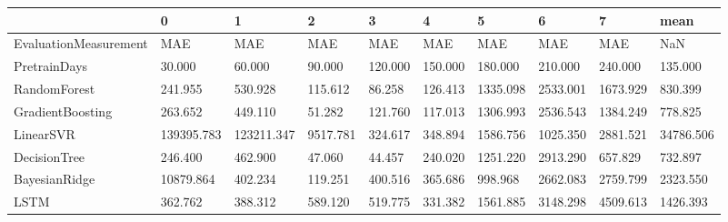 \begin{tabular}{llllllllll}
\toprule
{} &          0 &          1 &        2 &       3 &       4 &        5 &        6 &        7 &      mean \\
\midrule
EvaluationMeasurement &        MAE &        MAE &      MAE &     MAE &     MAE &      MAE &      MAE &      MAE &       NaN \\
PretrainDays          &     30.000 &     60.000 &   90.000 & 120.000 & 150.000 &  180.000 &  210.000 &  240.000 &   135.000 \\
RandomForest          &    241.955 &    530.928 &  115.612 &  86.258 & 126.413 & 1335.098 & 2533.001 & 1673.929 &   830.399 \\
GradientBoosting      &    263.652 &    449.110 &   51.282 & 121.760 & 117.013 & 1306.993 & 2536.543 & 1384.249 &   778.825 \\
LinearSVR             & 139395.783 & 123211.347 & 9517.781 & 324.617 & 348.894 & 1586.756 & 1025.350 & 2881.521 & 34786.506 \\
DecisionTree          &    246.400 &    462.900 &   47.060 &  44.457 & 240.020 & 1251.220 & 2913.290 &  657.829 &   732.897 \\
BayesianRidge         &  10879.864 &    402.234 &  119.251 & 400.516 & 365.686 &  998.968 & 2662.083 & 2759.799 &  2323.550 \\
LSTM                  &    362.762 &    388.312 &  589.120 & 519.775 & 331.382 & 1561.885 & 3148.298 & 4509.613 &  1426.393 \\
\bottomrule
\end{tabular}
